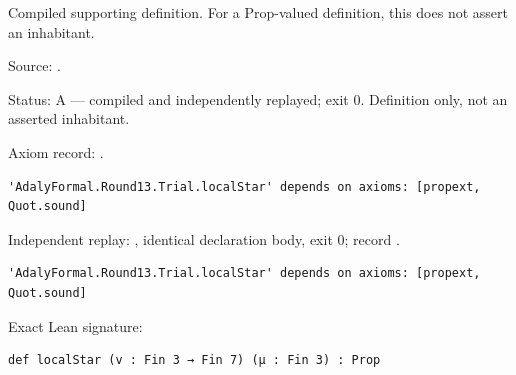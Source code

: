 \begin{definition}[bp-398]
\label{bp-398}
\leanok
Compiled supporting definition. For a Prop-valued definition, this does not assert an inhabitant.

\par Source: \texttt{}.
\par Status: A — compiled and independently replayed; exit 0. Definition only, not an asserted inhabitant.
\par Axiom record: \texttt{}.
\begin{verbatim}
'AdalyFormal.Round13.Trial.localStar' depends on axioms: [propext, Quot.sound]
\end{verbatim}
\par Independent replay: \texttt{}, identical declaration body, exit 0; record \texttt{}.
\begin{verbatim}
'AdalyFormal.Round13.Trial.localStar' depends on axioms: [propext, Quot.sound]
\end{verbatim}
\par Exact Lean signature:
\begin{verbatim}
def localStar (v : Fin 3 → Fin 7) (μ : Fin 3) : Prop
\end{verbatim}
\end{definition}

